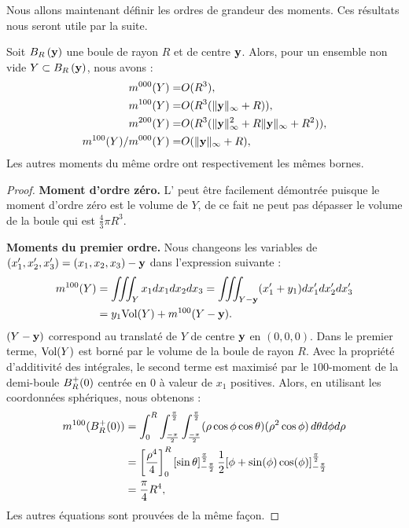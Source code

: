 Nous allons maintenant définir les ordres de grandeur des moments. Ces résultats nous seront
utile par la suite.
%
\begin{lemma}\label{lem:moment-ball}
  Soit $B_{R}\left(\mathbf{y}\right)$ une boule de rayon $R$ et de centre $\mathbf{y}$. Alors, pour un
  ensemble non vide $Y \subset B_{R}\left(\mathbf{y}\right)$, nous avons :
  \begin{align}
    m^{000}(Y) =& O(R^3), \label{eq:ball-moment-0}\\
    m^{100}(Y) =& O(R^3(\|\mathbf{y}\|_\infty + R)), \label{eq:ball-moment-1}\\
    m^{200}(Y) =& O(R^3(\|\mathbf{y}\|^2_\infty + R\|\mathbf{y}\|_\infty + R^2)), \label{eq:ball-moment-2}\\
    m^{100}(Y)/m^{000}(Y) =& O(\|\mathbf{y}\|_\infty + R), \label{eq:ball-moment-1bis}
  \end{align}
  Les autres moments du même ordre ont respectivement les mêmes bornes.
\end{lemma}
\begin{proof}
  \noindent\textbf{Moment d'ordre zéro.\quad}
  L' peut être facilement démontrée puisque le
  moment d'ordre zéro est le volume de $Y$, de ce fait ne peut pas dépasser le
  volume de la boule qui est $\frac{4}{3}\pi R^3$.


  \noindent\textbf{Moments du premier ordre.\quad}
  Nous changeons les variables de $(x_1',x_2',x_3')=(x_1,x_2,x_3)-\mathbf{y}$ dans
  l'expression suivante :
  \begin{align}
    m^{100}(Y) &= \iiint_Y x_1 dx_1 dx_2 dx_3 = \iiint_{Y-\mathbf{y}} (x_1'+y_1) dx_1'dx_2'dx_3' \\
                 &= y_1 \mathrm{Vol}(Y) + m^{100}(Y-\mathbf{y}).
  \end{align}
  $(Y-\mathbf{y})$ correspond au translaté de $Y$ de centre $\mathbf{y}$ en $(0,0,0)$. Dans le
  premier terme, $\mathrm{Vol}(Y)$ est borné par le volume de la boule de rayon $R$.
  Avec la propriété d'additivité des intégrales, le second terme est maximisé
  par le $100$-moment de la demi-boule $B^+_{R}(0)$ centrée en $0$ à valeur
  de $x_1$ positives. Alors, en utilisant les coordonnées sphériques, nous
  obtenons :
  \begin{align}
    m^{100}(B^+_{R}(0))
    &= \int_{0}^{R} \int_{\frac{-\pi}{2}}^{\frac{\pi}{2}} \int_{\frac{-\pi}{2}}^{\frac{\pi}{2}} (\rho\cos\phi\cos\theta)(\rho^2 \cos\phi)  \, d\theta d\phi d\rho \\
    &= \left[\frac{\rho^4}{4} \right]_{0}^{R}  \left [\sin\theta\right ]^\frac{\pi}{2}_{-\frac{\pi}{2}}\frac{1}{2} [\phi + \sin(\phi)\cos(\phi)]^\frac{\pi}{2}_{-\frac{\pi}{2}} \\
    &= \frac{\pi}{4}R^4, \label{eq:exact-half-ball-moment-1}
  \end{align}
  Les autres équations sont prouvées de la même façon.
\end{proof}


